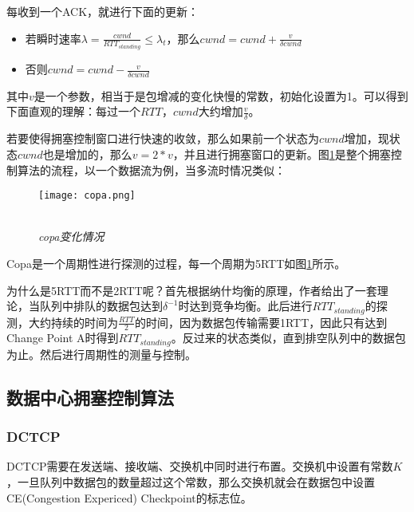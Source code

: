 \documentclass[a4paper, 12pt, UTF8]{ctexart}
\begin{document}
\par 每收到一个ACK，就进行下面的更新：\\
\begin{itemize}
	\item 若瞬时速率$\lambda = \frac{cwnd}{RTT_{standing}}\le \lambda_{t}$，那么$cwnd = cwnd+\frac{v}{\delta cwnd}$
	\item 否则$cwnd = cwnd - \frac{v}{\delta cwnd}$\\
\end{itemize}

\par 其中$v$是一个参数，相当于是包增减的变化快慢的常数，初始化设置为1。可以得到下面直观的理解：每过一个$RTT$，$cwnd$大约增加$\frac{v}{\delta}$。

\par 若要使得拥塞控制窗口进行快速的收敛，那么如果前一个状态为$cwnd$增加，现状态$cwnd$也是增加的，那么$v=2*v$，并且进行拥塞窗口的更新。图\ref{fig:copa algorithm}是整个拥塞控制算法的流程，以一个数据流为例，当多流时情况类似：
\begin{figure}[H]
	\centering \texttt{[image: copa.png]}
	\\ \hspace*{\fill} \\
	\caption{\em copa变化情况}
	\label{fig:copa algorithm}
\end{figure}

\par Copa是一个周期性进行探测的过程，每一个周期为5RTT如图\ref{fig:copa algorithm}所示。

\par 为什么是5RTT而不是2RTT呢？首先根据纳什均衡的原理，作者给出了一套理论，当队列中排队的数据包达到$\delta^{-1}$时达到竞争均衡。此后进行$RTT_{standing}$的探测，大约持续的时间为$\frac{RTT}{2}$的时间，因为数据包传输需要1RTT，因此只有达到Change Point A时得到$RTT_{standing}$。反过来的状态类似，直到排空队列中的数据包为止。然后进行周期性的测量与控制。

\subsection{数据中心拥塞控制算法}

\subsubsection{DCTCP}

\par DCTCP\cite{DBLP:conf/sigcomm/AlizadehGMPPPSS10}需要在发送端、接收端、交换机中同时进行布置。交换机中设置有常数$K$，一旦队列中数据包的数量超过这个常数，那么交换机就会在数据包中设置CE(Congestion Expericed) Checkpoint的标志位。
\end{document}
